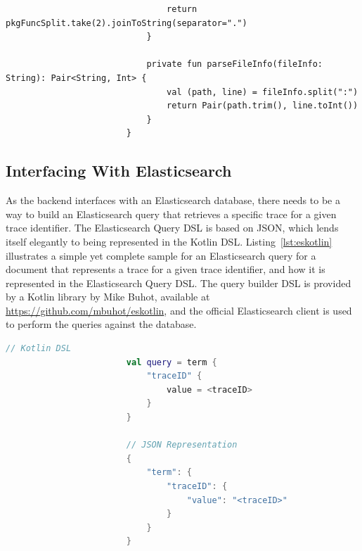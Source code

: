\documentclass[12pt,pdftex,titlepage]{report}
\begin{document}
\begin{spacing}{1.0}
\begin{lstlisting}
                                return pkgFuncSplit.take(2).joinToString(separator=".")
                            }
                        
                            private fun parseFileInfo(fileInfo: String): Pair<String, Int> {
                                val (path, line) = fileInfo.split(":")
                                return Pair(path.trim(), line.toInt())
                            }
                        }
                    \end{lstlisting}
                \end{spacing}
            
            \subsection{Interfacing With Elasticsearch}
                As the backend interfaces with an Elasticsearch database, there needs to be a way to build an Elasticsearch query that retrieves a specific trace for a given trace identifier. The Elasticsearch Query DSL
                is based on JSON, which lends itself elegantly to being represented in the Kotlin DSL. Listing~\ref{lst:eskotlin} illustrates a simple yet complete sample for an Elasticsearch query for a document that
                represents a trace for a given trace identifier, and how it is represented in the Elasticsearch Query DSL. The query builder DSL is provided by a Kotlin library by Mike Buhot, available at 
                \url{https://github.com/mbuhot/eskotlin}, and the official Elasticsearch client is used to perform the queries against the database.

                \bigskip
                \begin{spacing}{1.0}
                    \begin{lstlisting}[caption={[Kotlin DSL Elasticsearch query and its JSON representation]Comparison between Elasticsearch query using Kotlin DSL and the query in its JSON representation, where $\langle$traceID$\rangle$ refers
                        to a variable storing the trace identifier.}, label={lst:eskotlin}, language=Kotlin, gobble=24]
                        // Kotlin DSL
                        val query = term { 
                            "traceID" {
                                value = <traceID>
                            }
                        }

                        // JSON Representation
                        {
                            "term": {
                                "traceID": { 
                                    "value": "<traceID>" 
                                }
                            }
                        }
                    \end{lstlisting}
                \end{spacing}
\end{document}
